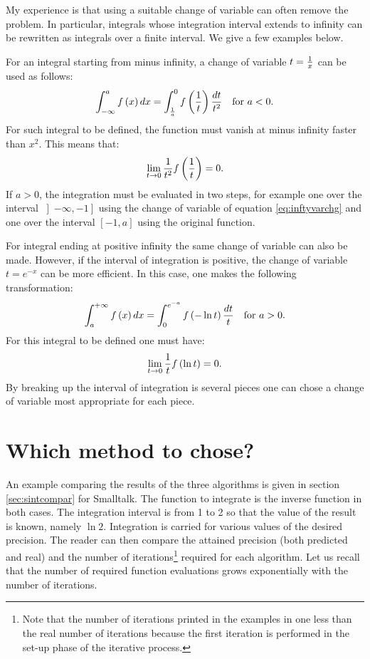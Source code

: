  My experience is that using a suitable
change of variable can often remove the problem. In particular,
integrals whose integration interval extends to infinity can be
rewritten as integrals over a finite interval. We give a few
examples below.

For an integral starting from minus infinity, a change of variable
$t={1 \over x}$ can be used as follows:
\begin{equation}
\label{eq:inftyvarchg}
  \int_{-\infty}^a f\left(x\right)dx= \int_{1\over a}^0 f\left({1\over
  t}\right){dt\over t^2}\mbox{\quad for $a<0$.}
\end{equation}
For such integral to be defined, the function must vanish at minus
infinity faster than $x^2$. This means that:
\begin{equation}
  \lim_{t \to 0}{1\over t^2}f\left({1\over
  t}\right)=0.
\end{equation}
If $a>0$, the integration must be evaluated in two steps, for
example one over the interval $\left]-\infty,-1\right]$ using the
change of variable of equation \ref{eq:inftyvarchg} and one over
the interval $\left[-1,a\right]$ using the original function.

For integral ending at positive infinity the same change of
variable can also be made. However, if the interval of integration
is positive, the change of variable $t=e^{-x}$ can be more
efficient. In this case, one makes the following transformation:
\begin{equation}
\int_a^{+\infty} f\left(x\right)dx=\int_0^{e^{-a}}f\left(-\ln t
\right){dt \over t}\mbox{\quad for $a>0$}.
\end{equation}
For this integral to be defined one must have:
\begin{equation}
  \lim_{t \to 0}{1\over t}f\left(\ln
  t\right)=0.
\end{equation}
By breaking up the interval of integration is several pieces one
can chose a change of variable most appropriate for each piece.

\section{Which method to chose?}
\label{sec:intwhich} An example comparing the results of the three
algorithms is given in section \ref{sec:sintcompar} for Smalltalk.
The function to integrate is the inverse function in both cases. The integration
interval is from 1 to 2 so that the value of the result is known,
namely $\ln 2$. Integration is carried for various values of the
desired precision. The reader can then compare the attained
precision (both predicted and real) and the number of
iterations\footnote{Note that the number of iterations printed in
the examples in one less than the real number of iterations
because the first iteration is performed in the set-up phase of
the iterative process.} required for each algorithm. Let us recall
that the number of required function evaluations grows
exponentially with the number of iterations.

